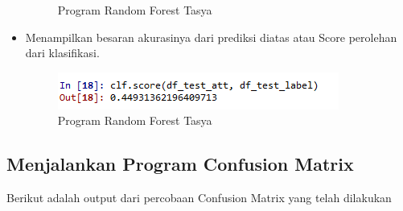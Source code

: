 \begin{itemize}
\begin{figure}[ht]
\caption{Program Random Forest Tasya}
\label{Praktek}
\end{figure}
\item Menampilkan besaran akurasinya dari prediksi diatas atau Score perolehan dari klasifikasi.
\begin{figure}[ht]
\centering
\includegraphics[scale=0.5]{figures/rf18.png}
\caption{Program Random Forest Tasya}
\label{Praktek}
\end{figure}
\end{itemize}

\subsection{Menjalankan Program Confusion Matrix}
Berikut adalah output dari percobaan Confusion Matrix yang telah dilakukan
